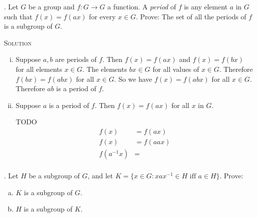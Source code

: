 \documentclass[twoside]{amsart}
\newcommand{\solution}{\textsc{Solution}\xspace}
\begin{document}
\begin{enumerate}[A.]
   . Let $G$ be a group and $f : G \rightarrow G$ a function.
   A \emph{period} of $f$ is any element $a$ in $G$
   such that $f(x) = f(ax)$ for every $x \in G$. Prove: The set of
   all the periods of $f$ is a subgroup of $G$.

   \noindent \solution 
   \begin{enumerate}[(i)]
      \item Suppose $a,b$ are periods of $f$. Then $f(x)=f(ax)$ and
      $f(x)=f(bx)$ for all elements $x\in G$. The elements $bx \in G$
      for all values of $x \in G$. Therefore $f(bx) = f(abx)$ for
      all $x \in G$. So we have $f(x)=f(abx)$ for all $x \in G$.
      Therefore $ab$ is a period of $f$.

      \item Suppose $a$ is a period of $f$. Then $f(x)=f(ax)$ for
      all $x$ in $G$.

      TODO
      \begin{align*}
         f(x) & = f(ax) \\
	 f(x) & = f(aax) \\
	 f(a^{-1}x) & = \\
      \end{align*}

   \end{enumerate}

   . Let $H$ be a subgroup of $G$, and let $K = \{
      x \in G : xax^{-1} \in H \text{ iff } a \in H \}$. Prove:
      \begin{enumerate}[(a)]
         \item $K$ is a subgroup of $G$.
	 \item $H$ is a subgroup of $K$.
      \end{enumerate}

\end{enumerate}
\end{document}
